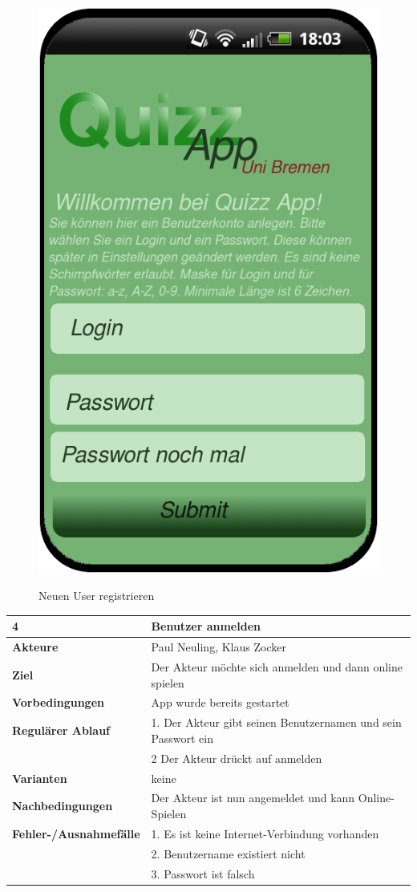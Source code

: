\documentclass[fontsize=12pt,paper=a4,twoside]{scrartcl}
\begin{document}
\begin{figure}
	[H] \caption{Neuen User registrieren} 
	\includegraphics[width=0.5
	\textwidth]{Bilder/QuizzRegisterNewUser.png} \label{pic:neuuser} 
\end{figure}

\begin{table}
	[H] \label{4} 
	\begin{tabular}
		{|l|p{10cm}|} \hline \textbf{4} & \textbf{Benutzer anmelden} \\
		\hline \textbf{Akteure} & Paul Neuling, Klaus Zocker\\
		\hline \textbf{Ziel} & Der Akteur möchte sich anmelden und dann online spielen \\
		\hline \textbf{Vorbedingungen} & App wurde bereits gestartet \\
		\hline \textbf{Regulärer Ablauf} & 1. Der Akteur gibt seinen Benutzernamen und sein Passwort ein \\
		&2 Der Akteur drückt auf anmelden\\
		\hline \textbf{Varianten} & keine \\
		\hline \textbf{Nachbedingungen} & Der Akteur ist nun angemeldet und kann Online-Spielen\\
		\hline \textbf{Fehler-/Ausnahmefälle} & 1. Es ist keine Internet-Verbindung vorhanden \\
		&2. Benutzername existiert nicht\\
		&3. Passwort ist falsch\\
		\hline 
	\end{tabular}
\end{table}
\end{document}
